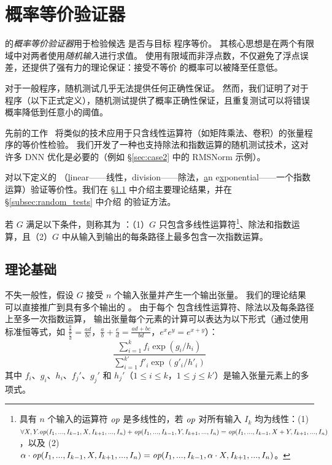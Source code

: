 \section{概率等价验证器}
\label{sec:verify}

\sys 的{\em 概率等价验证器}用于检验候选 \graph 是否与目标 \lax 程序等价。
其核心思想是在两个有限域中对两者使用{\em 随机输入}进行求值。
使用有限域而非浮点数，不仅避免了浮点误差，还提供了强有力的理论保证：接受不等价 \graph 的概率可以被降至任意低。

对于一般程序，随机测试几乎无法提供任何正确性保证。
然而，我们证明了对于 \lax 程序（以下正式定义），随机测试提供了概率正确性保证，且重复测试可以将错误概率降低到任意小的阈值。

先前的工作~\cite{wang2021pet} 将类似的技术应用于只含线性运算符（如矩阵乘法、卷积）的张量程序的等价性检验。
我们开发了一种也支持除法和指数运算的随机测试技术，这对许多 DNN 优化是必要的（例如 \S\ref{sec:case2} 中的 RMSNorm 示例）。

\sys 对以下定义的 \lax \graphs（\underline{l}inear——线性，division——除法，\underline{a}n e\underline{x}ponential——一个指数运算）验证等价性。我们在 \S\ref{subsec:theory} 中介绍主要理论结果，并在 \S\ref{subsec:random_tests} 中介绍 \sys 的验证方法。

\begin{definition}[\lax \graph]
若 \graph $G$ 满足以下条件，则称其为 \lax \graph：（1）$G$ 只包含多线性运算符\footnote{具有 $n$ 个输入的运算符 $\mbox{\rm\em op}$ 是多线性的，若 $\mbox{\rm\em op}$ 对所有输入 $I_k$ 均为线性：(1) $\forall X, Y. \mbox{\rm\em op}(I_1,...,I_{k-1},X,I_{k+1},...,I_n)+\mbox{\rm\em op}(I_1,...,I_{k-1},Y,I_{k+1},...,I_n)=\mbox{\rm\em op}(I_1,...,I_{k-1},X+Y,I_{k+1},...,I_n)$，以及 (2) $\alpha \cdot \mbox{\rm\em op}(I_1,...,I_{k-1},X,I_{k+1},...,I_n) = \mbox{\rm\em op}(I_1,...,I_{k-1},\alpha\cdot X,I_{k+1},...,I_n)$。}、除法和指数运算，且（2）$G$ 中从输入到输出的每条路径上最多包含一次指数运算。
\end{definition}

\subsection{理论基础}
\label{subsec:theory}
不失一般性，假设 \lax \graph $G$ 接受 $n$ 个输入张量并产生一个输出张量。
我们的理论结果可以直接推广到具有多个输出的 \lax \graph。
由于每个 \lax \graph 包含线性运算符、除法以及每条路径上至多一次指数运算，
输出张量每个元素的计算可以表达为以下形式（通过使用标准恒等式，如 $\frac{\frac{a}{b}}{\frac{c}{d}} = \frac{ad}{bc}$，$\frac{a}{b} + \frac{c}{d} = \frac{ad+bc}{bd}$，$e^{x}e^{y}=e^{x+y}$）：
\begin{equation}
\label{eq:lax}
\frac{\sum_{i=1}^k f_i \exp(g_i/h_i)}{\sum_{i=1}^{k'} f'_i \exp(g'_i/h'_i)}
\end{equation}
其中 $f_i$、$g_i$、$h_i$、$f_j'$、$g_j'$ 和 $h_j'$（$1\leq i \leq k$，$1 \leq j \leq k'$）是输入张量元素上的多项式。

